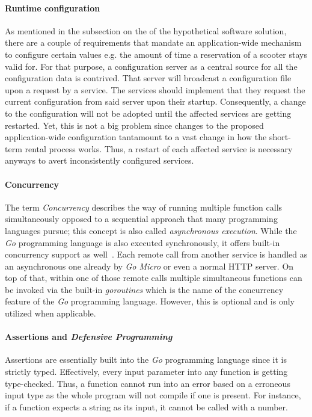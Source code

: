 \documentclass[12pt,a4paper,twoside]{report}
\begin{document}
\paragraph{Runtime configuration}
As mentioned in the subsection on the \textit{}
of the hypothetical software solution, there are a couple of requirements that
mandate an application-wide mechanism to configure certain values e.g.
the amount of time a reservation of a scooter stays valid for.
For that purpose, a configuration server as a central source for all the
configuration data is contrived. That server will broadcast a configuration file
upon a request by a service. The services should implement that they request
the current configuration from said server upon their startup. Consequently,
a change to the configuration will not be adopted until the affected services
are getting restarted. Yet, this is not a big problem since changes to the proposed
application-wide configuration tantamount to a vast change in how the
short-term rental process works. Thus, a restart of each affected service is
necessary anyways to avert inconsistently configured services.

\paragraph{Concurrency}
The term \textit{Concurrency} describes the way of running multiple function
calls simultaneously opposed to a sequential approach that many programming languages
pursue; this concept is also called \textit{asynchronous execution}.
While the \textit{Go} programming language is also executed synchronously,
it offers built-in concurrency support as well~\cite{golang-concurrency}.
Each remote call from another service is handled as an asynchronous one already
by \textit{Go Micro} or even a normal HTTP server. On top of that, within one
of those remote calls multiple simultaneous functions can be invoked via
the built-in \textit{goroutines} which is the name of the concurrency feature
of the \textit{Go} programming language. However, this is optional and is only
utilized when applicable.

\paragraph{Assertions and \textit{Defensive Programming}}
Assertions are essentially built into the \textit{Go} programming language
since it is strictly typed. Effectively, every input parameter into any
function is getting type-checked. Thus, a function cannot run into an error
based on a erroneous input type as the whole program will not compile
if one is present. For instance, if a function expects a string as its input,
it cannot be called with a number.
\end{document}
